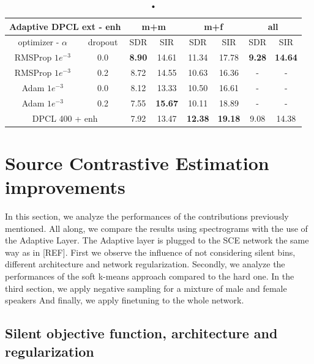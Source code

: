 \documentclass[master, tikz, final,11pt, dvipdfmx]{iscs-thesis}
\begin{document}
\begin{table}
\centering
\begin{tabular}{c|c|c|c|c|c|c|c}
\multicolumn{2}{c|}{Adaptive DPCL ext - enh} & \multicolumn{2}{c|}{m+m} & \multicolumn{2}{c|}{m+f} & \multicolumn{2}{c}{all} \\ 
\hline 
optimizer - $\alpha$ & dropout & SDR & SIR & SDR & SIR & SDR & SIR \\ 
\hline 
RMSProp $1e^{-3}$ & 0.0 & \textbf{8.90} & 14.61 & 11.34 & 17.78 & \textbf{9.28} & \textbf{14.64} \\ 
RMSProp $1e^{-3}$ & 0.2 & 8.72 & 14.55 & 10.63 & 16.36 & - & - \\ 
Adam $1e^{-3}$ & 0.0 & 8.12 & 13.33 & 10.50 & 16.61 & - & - \\ 
Adam $1e^{-3}$ & 0.2 & 7.55 & \textbf{15.67} & 10.11 & 18.89 & - & - \\ 
\hline 
\hline 
\multicolumn{2}{c|}{DPCL 400 + enh}
 & 7.92 & 13.47 & \textbf{12.38} & \textbf{19.18} & 9.08 & 14.38 \\ 
\end{tabular}
\captionsetup{justification=centering}
\caption{•}
\label{table:AdaptDPCLext}
\end{table}

\section{Source Contrastive Estimation improvements}

In this section, we analyze the performances of the contributions previously mentioned. All along, we compare the results using spectrograms with the use of the Adaptive Layer. The Adaptive layer is plugged to the SCE network the same way as in [REF].
First we observe the influence of not considering silent bins, different architecture and network regularization. Secondly, we analyze the performances of the soft k-means approach compared to the hard one. In the third section, we apply negative sampling for a mixture of male and female speakers
And finally, we apply finetuning to the whole network.

\subsection{Silent objective function, architecture and regularization}
\label{silentloss}
\end{document}

